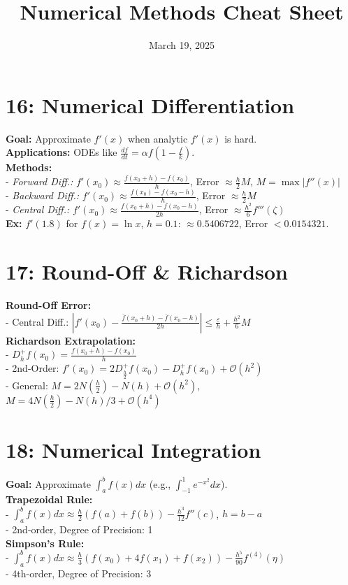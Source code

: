 \documentclass[9pt]{article}
\title{Numerical Methods Cheat Sheet}
\author{}
\date{March 19, 2025}
\begin{document}
\maketitle
\begin{multicols}{2}

\section*{16: Numerical Differentiation}
\textbf{Goal:} Approximate $f'(x)$ when analytic $f'(x)$ is hard. \\
\textbf{Applications:} ODEs like $\frac{df}{dt} = \alpha f\left(1-\frac{f}{k}\right)$. \\
\textbf{Methods:} \\
- \textit{Forward Diff.:} $f'(x_0) \approx \frac{f(x_0+h)-f(x_0)}{h}$, Error $\approx \frac{h}{2}M$, $M = \max|f''(x)|$ \\
- \textit{Backward Diff.:} $f'(x_0) \approx \frac{f(x_0)-f(x_0-h)}{h}$, Error $\approx \frac{h}{2}M$ \\
- \textit{Central Diff.:} $f'(x_0) \approx \frac{f(x_0+h)-f(x_0-h)}{2h}$, Error $\approx \frac{h^2}{6}f'''(\zeta)$ \\
\textbf{Ex:} $f'(1.8)$ for $f(x) = \ln x$, $h=0.1$: $\approx 0.5406722$, Error $< 0.0154321$.

\section*{17: Round-Off \& Richardson}
\textbf{Round-Off Error:} \\
- Central Diff.: $\left|f'(x_0) - \frac{\bar{f}(x_0+h)-\bar{f}(x_0-h)}{2h}\right| \leq \frac{\varepsilon}{h} + \frac{h^2}{6}M$ \\
\textbf{Richardson Extrapolation:} \\
- $D^+_hf(x_0) = \frac{f(x_0+h)-f(x_0)}{h}$ \\
- 2nd-Order: $f'(x_0) = 2D^+_{\frac{h}{2}}f(x_0) - D^+_hf(x_0) + \mathcal{O}(h^2)$ \\
- General: $M = 2N\left(\frac{h}{2}\right) - N(h) + \mathcal{O}(h^2)$, $M = 4N\left(\frac{h}{2}\right) - N(h)/3 + \mathcal{O}(h^4)$

\section*{18: Numerical Integration}
\textbf{Goal:} Approximate $\int_a^b f(x)dx$ (e.g., $\int_{-1}^1 e^{-x^2}dx$). \\
\textbf{Trapezoidal Rule:} \\
- $\int_a^b f(x)dx \approx \frac{h}{2}(f(a)+f(b)) - \frac{h^3}{12}f''(c)$, $h = b-a$ \\
- 2nd-order, Degree of Precision: 1 \\
\textbf{Simpson’s Rule:} \\
- $\int_a^b f(x)dx \approx \frac{h}{3}(f(x_0)+4f(x_1)+f(x_2)) - \frac{h^5}{90}f^{(4)}(\eta)$ \\
- 4th-order, Degree of Precision: 3


\end{multicols}
\end{document}
